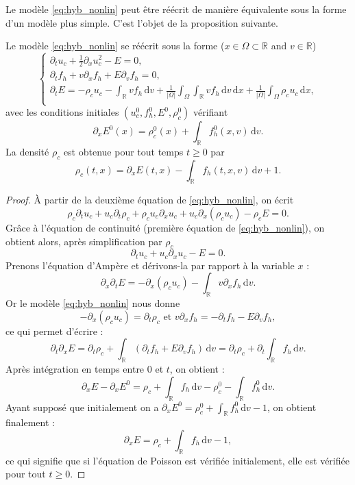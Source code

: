 Le mod\`ele \eqref{eq:hyb_nonlin} peut \^etre r\'e\'ecrit de mani\`ere \'equivalente sous la forme d'un mod\`ele plus simple. 
C'est l'objet de la proposition suivante.  
\begin{pro}
  Le modèle \eqref{eq:hyb_nonlin} se réécrit sous la forme ($x\in\Omega\subset \mathbb{R}$ and $v\in\mathbb{R}$)
  $$
    \begin{cases}
      \partial_t u_c + \frac{1}{2}\partial_x u_c^2 - E = 0, \\
      \partial_t f_h + v\partial_x f_h + E\partial_v f_h = 0, \\
      \partial_t E = -\rho_c u_c -\int_{\mathbb{R}} vf_h\,\mathrm{d}v+ \frac{1}{|\Omega|}\int_\Omega \int_{\mathbb{R}} vf_h\,\mathrm{d}v \,\mathrm{d}x+ \frac{1}{|\Omega|}\int_\Omega \rho_cu_c \,\mathrm{d}x, \\
      \label{eq:hyb_nonlin_red}
    \end{cases}
  $$
  avec les conditions initiales $(u^0_{c}, f^0_{h}, E^0, \rho_c^0)$ vérifiant
  $$
    \partial_x E^0(x) = \rho^0_{c}(x)+\int_{\mathbb{R}} f^0_{h}(x, v)\,\mathrm{d}v.
  $$
  La densité $\rho_c$ est obtenue pour tout temps $t\geq 0$ par  
  $$
    \rho_c(t, x) = \partial_x E(t, x) - \int_{\mathbb{R}} f_{h}(t, x, v)\,\mathrm{d}v + 1. 
  $$
\end{pro}

\begin{proof}
  À partir de la deuxième équation de \eqref{eq:hyb_nonlin}, on écrit 
  $$
    \rho_c \partial_t u_c + u_c\partial_t \rho_c + \rho_c u_c\partial_x u_c + u_c  \partial_x (\rho_c u_c) - \rho_c E=0. 
  $$
  Grâce à l'équation de continuité (première équation de \eqref{eq:hyb_nonlin}), on obtient alors, après simplification par $\rho_c$  
  $$
    \partial_t u_c +  u_c\partial_x u_c - E=0. 
  $$
  Prenons l'équation d'Ampère et dérivons-la par rapport à la variable $x$ :
  $$
    \partial_x\partial_t E = -\partial_x(\rho_cu_c) - \int_{\mathbb{R}} v\partial_x f_h\,\mathrm{d}v.
  $$
  Or le modèle \eqref{eq:hyb_nonlin} nous donne  
  $$
    -\partial_x(\rho_cu_c) = \partial_t\rho_c \mbox{ et } v\partial_xf_h = -\partial_tf_h - E\partial_vf_h, 
  $$ 
  ce qui permet d'écrire :
  $$
    \partial_t\partial_x E = \partial_t\rho_c + \int_{\mathbb{R}} (\partial_tf_h + E\partial_vf_h) \,\mathrm{d}v = \partial_t\rho_c + \partial_t \int_{\mathbb{R}}  f_h  \,\mathrm{d}v .
  $$
  Après intégration en temps entre $0$ et $t$, on obtient :
  $$
    \partial_x E - \partial_xE^0 = \rho_c + \int_{\mathbb{R}} f_h\,\mathrm{d}v - \rho_c^0 - \int_{\mathbb{R}} f_h^0\,\mathrm{d}v.
  $$
  Ayant supposé que initialement on a $\partial_xE^0 = \rho_c^0 + \int_{\mathbb{R}} f_h^0\,\mathrm{d}v -1$, on obtient finalement :
  $$
    \partial_x E = \rho_c + \int_{\mathbb{R}} f_h\,\mathrm{d}v - 1,
  $$
  ce qui signifie que si l'équation de Poisson est vérifiée initialement, elle est vérifiée pour tout $t\geq 0$.
\end{proof}

